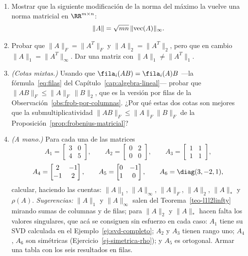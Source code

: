 \begin{enumerate}
\item\label{ej-medica} Mostrar que la siguiente modificación de la norma del
máximo la vuelve una norma matricial en $\RR^{m\times n}$:
\[\|A\| = \sqrt{mn}\,\|\textup{vec}(A)\|_{\infty} .\]

\item\label{ej-traspuesta} Probar que $\|A\|_F=\|A^T\|_F$ y
$\|A\|_2=\|A^T\|_2$, pero que en cambio $\|A\|_1=\|A^T\|_\infty$. Dar una
matriz con $\|A\|_1\neq\|A^T\|_1$.

\item\label{ej-mixtas} \emph{(Cotas mixtas.)} Usando que
$\fila_i(AB)=\fila_i(A)B$ ---la fórmula~\eqref{eq:filas} del
Capítulo~\ref{cap:algebra-lineal}--- probar que
$\|AB\|_F\le\|A\|_F\,\|B\|_2$, que es la versión por filas de la
Observación~\ref{obs:frob-por-columnas}. ¿Por qué estas dos cotas son mejores
que la submultiplicatividad $\|AB\|_F\le\|A\|_F\|B\|_F$ de la
Proposición~\ref{prop:frobenius-matricial}?

\item\label{ej-calcular-normas} \emph{(A mano.)} Para cada una de las matrices
\[
A_1=\begin{bmatrix}3&0\\ 4&5\end{bmatrix},\qquad
A_2=\begin{bmatrix}0&2\\ 0&0\end{bmatrix},\qquad
A_3=\begin{bmatrix}1&1\\ 1&1\end{bmatrix},
\]
\[
A_4=\begin{bmatrix}2&-1\\ -1&2\end{bmatrix},\qquad
A_5=\begin{bmatrix}0&-1\\ 1&0\end{bmatrix},\qquad
A_6=\diag(3,-2,1),
\]
calcular, haciendo las cuentas:
$\|A\|_1$, $\|A\|_\infty$, $\|A\|_F$, $\|A\|_2$, $\|A\|_*$ y $\rho(A)$.
\emph{Sugerencias:} $\|A\|_1$ y $\|A\|_\infty$ salen del
Teorema~\ref{teo-l1l2linfty} mirando sumas de columnas y de filas; para
$\|A\|_2$ y $\|A\|_*$ hacen falta los valores singulares, que acá se consiguen
sin esfuerzo en cada caso: $A_1$ tiene su SVD calculada en el
Ejemplo~\ref{ej:svd-completo}; $A_2$ y $A_3$ tienen rango uno;
$A_4$, $A_6$ son simétricas (Ejercicio~\ref{ej-simetrica-rho}); y $A_5$ es
ortogonal. Armar una tabla con los seis resultados en filas.


\end{enumerate}
